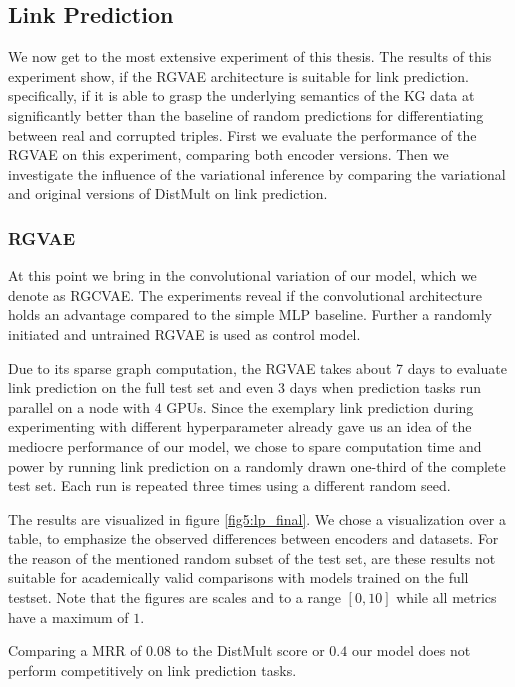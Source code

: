 \subsection{Link Prediction}


 We now get to the most extensive experiment of this thesis. The results of this experiment show, if the RGVAE architecture is suitable for link prediction. specifically, if it is able to grasp the underlying semantics of the KG data at significantly better than the baseline of random predictions for differentiating between real and corrupted triples. First we evaluate the performance of the RGVAE on this experiment, comparing both encoder versions. Then we investigate the influence of the variational inference by comparing the variational and original versions of DistMult on link prediction.
 
 \subsubsection{RGVAE}

 At this point we bring in the convolutional variation of our model, which we denote as RGCVAE. The experiments reveal if the convolutional architecture holds an advantage compared to the simple MLP baseline. Further a randomly initiated and untrained RGVAE is used as control model.
 
 Due to its sparse graph computation, the RGVAE takes about 7 days to evaluate link prediction on the full test set and even 3 days when prediction tasks run parallel on a node with $4$ GPUs. Since the exemplary link prediction during experimenting with different hyperparameter already gave us an idea of the mediocre performance of our model, we chose to spare computation time and power by running link prediction on a randomly drawn one-third of the complete test set. Each run is repeated three times using a different random seed.

The results are visualized in figure \ref{fig5:lp_final}. We chose a visualization over a table, to emphasize the observed differences between encoders and datasets. For the reason of the mentioned random subset of the test set, are these results not suitable for academically valid comparisons with models trained on the full testset. Note that the figures are scales and to a range $[0,10]$ while all metrics have a maximum of $1$.

Comparing a MRR of $0.08$ to the DistMult score or $0.4$ our model does not perform competitively on link prediction tasks.

